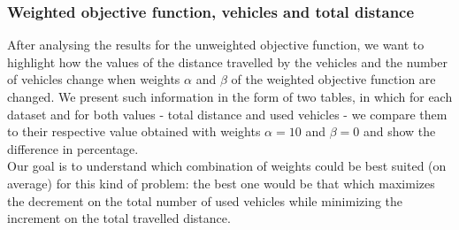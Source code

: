 \subsubsection{Weighted objective function, vehicles and total distance}
\label{subsubsec:distance-vehicles-weighted-obj-fun}
After analysing the results for the unweighted objective function, we want to highlight how the values of the distance travelled by the vehicles and the number of vehicles change when weights $\alpha$ and $\beta$ of the weighted objective function are changed.
We present such information in the form of two tables, in which for each dataset and for both values - total distance and used vehicles - we compare them to their respective value obtained with weights $\alpha=10$ and $\beta=0$ and show the difference in percentage.\\
Our goal is to understand which combination of weights could be best suited (on average) for this kind of problem: the best one would be that which maximizes the decrement on the total number of used vehicles while minimizing the increment on the total travelled distance.

